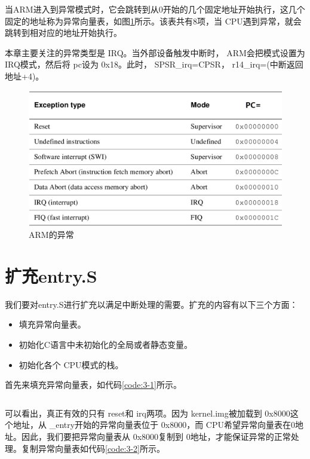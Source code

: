 \documentclass[main.tex]{subfiles}
\begin{document}
\begin{CJK*}{UTF8}{song}
当ARM进入到异常模式时，它会跳转到从0开始的几个固定地址开始执行，这几个固定的地址称为异常向量表，如图\ref{figure:3-2}所示。该表共有8项，当 CPU遇到异常，就会跳转到相对应的地址开始执行。

\par
本章主要关注的异常类型是 IRQ。当外部设备触发中断时， ARM会把模式设置为 IRQ模式，然后将 pc设为 0x18。此时， SPSR\_\-irq=CPSR， r14\_\-irq=(中断返回地址+4)。

\begin{figure}[htp]
\centering
\includegraphics[scale=0.35]{figures/3-2.png}
\caption{ARM的异常}
\label{figure:3-2}
\end{figure}

\section{扩充entry.S}
我们要对entry.S进行扩充以满足中断处理的需要。扩充的内容有以下三个方面：
\begin{itemize}
\item 填充异常向量表。
\item 初始化C语言中未初始化的全局或者静态变量。
\item 初始化各个 CPU模式的栈。
\end{itemize}

首先来填充异常向量表，如代码\ref{code:3-1}所示。

\begin{code}
\label{code:3-1}
\inputminted[firstline=73,lastline=104,linenos,numbersep=5pt,frame=lines,framesep=2mm]{gas}{src/chapter03/kernel/entry.S}
\end{code}

可以看出，真正有效的只有 reset和 irq两项。因为 kernel.img被加载到 0x8000这个地址，从 \_entry开始的异常向量表位于 0x8000，而 CPU希望异常向量表在0地址。因此，我们要把异常向量表从 0x8000复制到 0地址，才能保证异常的正常处理。复制异常向量表如代码\ref{code:3-2}所示。


\end{CJK*}
\end{document}
